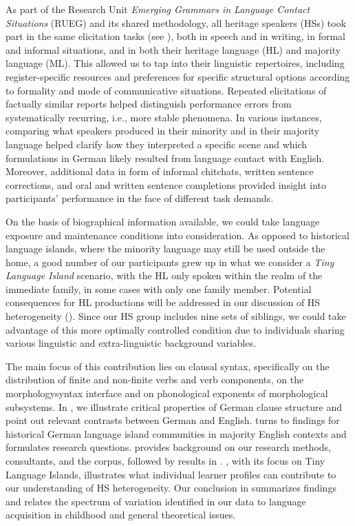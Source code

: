 \documentclass[output=paper]{langscibook}
\begin{document}
As part of the Research Unit \textit{Emerging Grammars in Language Contact Situations} (RUEG) and its shared methodology, all heritage speakers (HSs) took part in the same elicitation tasks (see ), both in speech and in writing, in formal and informal situations, and in both their heritage language (HL) and majority language (ML). This allowed us to tap into their linguistic repertoires, including register-specific resources and preferences for specific structural options according to formality and mode of communicative situations. Repeated elicitations of factually similar reports helped distinguish performance errors from systematically recurring, i.e., more stable phenomena. In various instances, comparing what speakers produced in their minority and in their majority language helped clarify how they interpreted a specific scene and which formulations in German likely resulted from language contact with English. Moreover, additional data in form of informal chitchats, written sentence corrections, and oral and written sentence completions provided insight into participants’ performance in the face of different task demands.

On the basis of biographical information available, we could take language exposure and maintenance conditions into consideration. As opposed to historical language islands, where the minority language may still be used outside the home, a good number of our participants grew up in what we consider a \textit{Tiny Language Island} scenario, with the HL only spoken within the realm of the immediate family, in some cases with only one family member. Potential consequences for HL productions will be addressed in our discussion of HS heterogeneity (). Since our HS group includes nine sets of siblings, we could take advantage of this more optimally controlled condition due to individuals sharing various linguistic and extra-linguistic background variables.

The main focus of this contribution lies on clausal syntax, specifically on the distribution of finite and non-finite verbs and verb components, on the morphologysyntax interface and on phonological exponents of morphological subsystems. In , we illustrate critical properties of German clause structure and point out relevant contrasts between German and English.  turns to findings for historical German language island communities in majority English contexts and formulates research questions.  provides background on our research methods, consultants, and the corpus, followed by results in . , with its focus on Tiny Language Islands, illustrates what individual learner profiles can contribute to our understanding of HS heterogeneity. Our conclusion in  summarizes findings and relates the spectrum of variation identified in our data to language acquisition in childhood and general theoretical issues.
\end{document}
